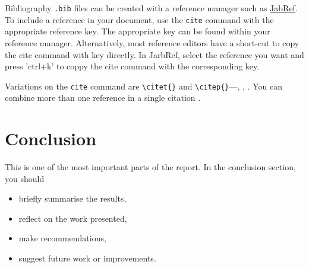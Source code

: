 \documentclass{UoNMCHA}
\numberwithin{equation}{section}
\begin{document}
Bibliography \texttt{.bib} files can be created with a reference manager such as \href{https://www.jabref.org/}{JabRef}. To include a reference in your document, use the \verb|cite| command with the appropriate reference key. The appropriate key can be found within your reference manager. Alternatively, most reference editors have a short-cut to copy the cite command with key directly. In JarbRef, select the reference you want and press 'ctrl+k' to coppy the cite command with the corresponding key.

\begin{figure}[ht]
    \begin{center}
    \end{center}
\end{figure}

Variations on the \verb|cite| command are \verb|\citet{}| and \verb|\citep{}|---\cite{strunk2007elements}, \citep{strunk2007elements}, \citet{strunk2007elements}. You can combine more than one reference in a single citation \citep{troyka1999simon, jay1995write}.

\newpage
\section{Conclusion}\label{sec:Conclusion}
This is one of the most important parts of the report. In the conclusion section, you  should 
\begin{itemize}
\item briefly summarise the results,
\item reflect on the work presented, 
\item make recommendations,
\item suggest future work or improvements.
\end{itemize}



\appendix
\newpage
\end{document}
